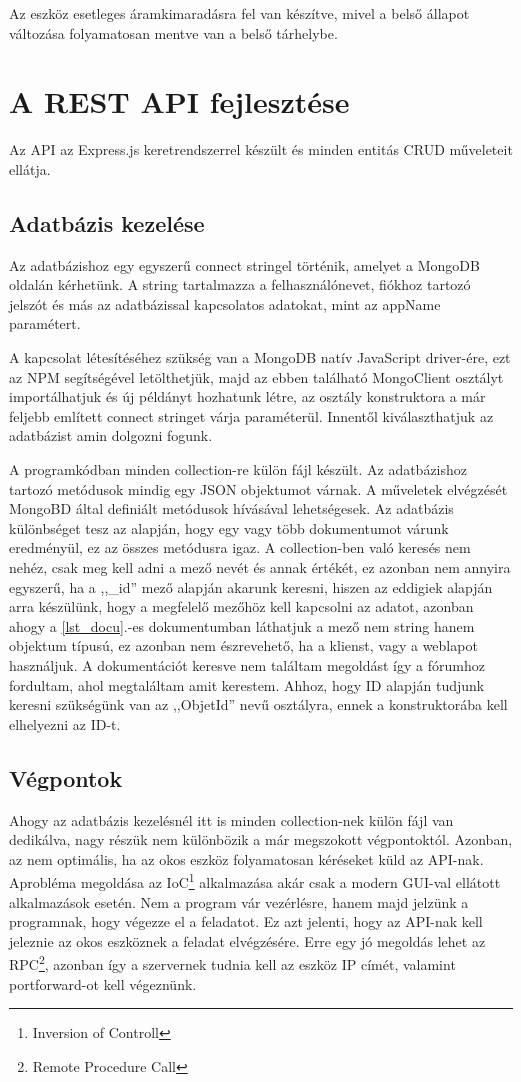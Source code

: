 \documentclass{thesis-ekf}
\theoremstyle{definition}
\theoremstyle{remark}
\begin{document}
	  Az eszköz esetleges áramkimaradásra fel van készítve, mivel a belső állapot változása folyamatosan mentve van a belső tárhelybe.
	\chapter{A REST API fejlesztése}
	\label{ch_API}
	Az API az Express.js keretrendszerrel készült és minden entitás CRUD műveleteit ellátja.
	\section{Adatbázis kezelése}
	Az adatbázishoz egy egyszerű connect stringel történik, amelyet a MongoDB oldalán kérhetünk. A string tartalmazza a felhasználónevet, fiókhoz tartozó jelszót és más az adatbázissal kapcsolatos adatokat, mint az appName paramétert.
	
	A kapcsolat létesítéséhez szükség van a MongoDB natív JavaScript driver-ére, ezt az NPM segítségével letölthetjük, majd az ebben található MongoClient osztályt importálhatjuk és új példányt hozhatunk létre, az osztály konstruktora a már feljebb említett connect stringet várja paraméterül. Innentől kiválaszthatjuk az adatbázist amin dolgozni fogunk.
	
	A programkódban minden collection-re külön fájl készült.  Az adatbázishoz tartozó metódusok mindig egy JSON objektumot várnak. A műveletek elvégzését MongoBD által definiált metódusok hívásával lehetségesek. Az adatbázis különbséget tesz az alapján, hogy egy vagy több dokumentumot várunk eredményül, ez az összes metódusra igaz. A collection-ben való keresés nem nehéz, csak meg kell adni a mező nevét és annak értékét, ez azonban nem annyira egyszerű, ha a ,,\_id'' mező alapján akarunk keresni, hiszen az eddigiek alapján arra készülünk, hogy a megfelelő mezőhöz kell kapcsolni az adatot, azonban ahogy a \ref{lst_docu}.-es dokumentumban láthatjuk a mező nem string hanem objektum típusú, ez azonban nem észrevehető, ha a klienst, vagy a weblapot használjuk. A dokumentációt\cite{bib_mongo_docs} keresve nem találtam megoldást így a fórumhoz\cite{bib_mongo_forum} fordultam, ahol megtaláltam amit kerestem. Ahhoz, hogy ID alapján tudjunk keresni szükségünk van az ,,ObjetId'' nevű osztályra, ennek a konstruktorába kell elhelyezni az ID-t.
	
	\section{Végpontok}
	Ahogy az adatbázis kezelésnél itt is minden collection-nek külön fájl van dedikálva, nagy részük nem különbözik a már megszokott végpontoktól. Azonban, az nem optimális, ha az okos eszköz folyamatosan kéréseket küld az API-nak. Aprobléma megoldása az IoC\footnote{Inversion of Controll} alkalmazása akár csak a modern GUI-val ellátott alkalmazások esetén. Nem a program vár vezérlésre, hanem majd jelzünk a programnak, hogy végezze el a feladatot. Ez azt jelenti, hogy az API-nak kell jeleznie az okos eszköznek a feladat elvégzésére. Erre egy jó megoldás lehet az RPC\footnote{Remote Procedure Call}, azonban így a szervernek tudnia kell az eszköz IP címét, valamint portforward-ot kell végeznünk.
\end{document}
